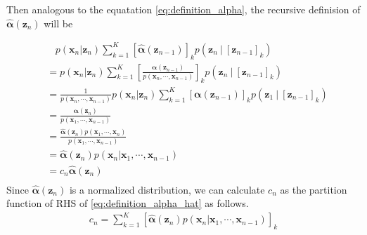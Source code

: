 \documentclass[a4]{article}
\begin{document}
Then analogous to the equatation \ref{eq:definition_alpha},
the recursive definision of $\bm{\hat{\alpha}}(\bm{z}_n)$ will be

\begin{equation}
\begin{aligned}
&
\:\:\:\:p( \bm{x}_{n} | \bm{z}_n ) 
\sum_{k=1}^K [\bm{\hat{\alpha}}(\bm{z}_{n-1})]_k p( \bm{z}_n \:|\ [\bm{z}_{n-1}]_k )\\
&=
p( \bm{x}_{n} | \bm{z}_n ) 
\sum_{k=1}^K \left[
\frac{\bm{\alpha}(\bm{z}_{n-1})}{p(\bm{x}_n, \cdots, \bm{x}_{n-1})}
\right]_k p( \bm{z}_n \:|\ [\bm{z}_{n-1}]_k )\\
&=
\frac{1}{p(\bm{x}_n, \cdots, \bm{x}_{n-1})}
p( \bm{x}_{n} | \bm{z}_n ) 
\sum_{k=1}^K \left[\bm{\alpha}(\bm{z}_{n-1})\right]_k p( \bm{z}_1 \:|\ [\bm{z}_{n-1}]_k )\\
&=
\frac{\bm{\alpha}(\bm{z}_{n})}{p(\bm{x}_1, \cdots, \bm{x}_{n-1})}\\
&=
\frac{ \bm{\hat{\alpha}}({\bm{z}_n})p(\bm{x}_1, \cdots, \bm{x}_{n}) }
     { p(\bm{x}_1, \cdots, \bm{x}_{n-1}) }\\
&=
\bm{\hat{\alpha}}({\bm{z}_n})p(\bm{x}_n | \bm{x}_1, \cdots, \bm{x}_{n-1})\\
&= c_n\bm{\hat{\alpha}}({\bm{z}_n})
\label{eq:definition_alpha_hat}\\
\end{aligned}
\end{equation}
Since $\bm{\hat{\alpha}}({\bm{z}_n})$ is a normalized distribution, we can calculate
$c_n$ as the partition function of RHS of \ref{eq:definition_alpha_hat} as follows.
\begin{equation}
\begin{aligned}
c_n = \sum_{k=1}^K [\bm{\hat{\alpha}}({\bm{z}_n})p(\bm{x}_n | \bm{x}_1, \cdots, \bm{x}_{n-1})]_k
\end{aligned}
\end{equation}
\end{document}
